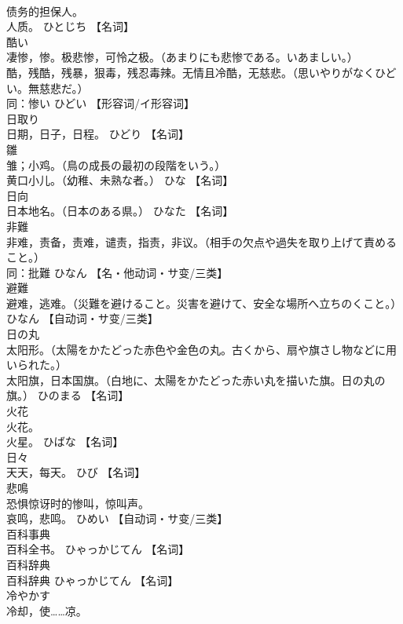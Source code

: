 \documentclass[8pt]{extreport}
\begin{document}
\begin{CJK}{UTF8}{min}
\\	债务的担保人。 
\\	人质。	ひとじち		【名词】
\\	酷い	
\\	凄惨，惨。极悲惨，可怜之极。（あまりにも悲惨である。いあましい。） 
\\	酷，残酷，残暴，狠毒，残忍毒辣。无情且冷酷，无慈悲。（思いやりがなくひどい。無慈悲だ。） 
\\	同：惨い	ひどい		【形容词/イ形容词】
\\	日取り	
\\	日期，日子，日程。	ひどり		【名词】
\\	雛	
\\	雏；小鸡。（鳥の成長の最初の段階をいう。） 
\\	黄口小儿。（幼稚、未熟な者。）	ひな		【名词】
\\	日向	
\\	日本地名。（日本のある県。）	ひなた		【名词】
\\	非難	
\\	非难，责备，责难，谴责，指责，非议。（相手の欠点や過失を取り上げて責めること。） 
\\	同：批難	ひなん		【名・他动词・サ变/三类】
\\	避難	
\\	避难，逃难。（災難を避けること。災害を避けて、安全な場所へ立ちのくこと。）	ひなん		【自动词・サ变/三类】
\\	日の丸	
\\	太阳形。（太陽をかたどった赤色や金色の丸。古くから、扇や旗さし物などに用いられた。） 
\\	太阳旗，日本国旗。（白地に、太陽をかたどった赤い丸を描いた旗。日の丸の旗。）	ひのまる		【名词】
\\	火花	
\\	火花。 
\\	火星。	ひばな		【名词】
\\	日々	
\\	天天，每天。	ひび		【名词】
\\	悲鳴	
\\	恐惧惊讶时的惨叫，惊叫声。 
\\	哀鸣，悲鸣。	ひめい		【自动词・サ变/三类】
\\	百科事典	
\\	百科全书。	ひゃっかじてん		【名词】
\\	百科辞典	
\\	百科辞典	ひゃっかじてん		【名词】
\\	冷やかす	
\\	冷却，使……凉。 

\end{CJK}
\end{document}
